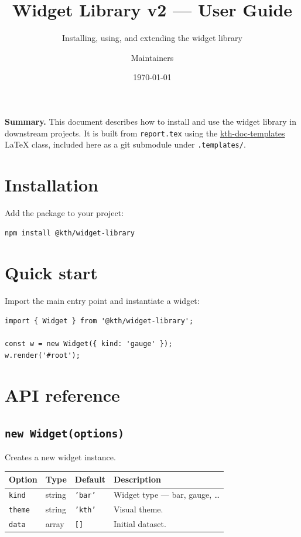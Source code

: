 \documentclass[english,11pt]{kth-document}
\title{Widget Library v2 --- User Guide}
\subtitle{Installing, using, and extending the widget library}
\author{Maintainers}
\affiliation{KTH Royal Institute of Technology}
\date{\today}
\begin{document}
\maketitle

\begin{kthbox}
\textbf{Summary.} This document describes how to install and use the
widget library in downstream projects. It is built from \texttt{report.tex}
using the \href{https://github.com/kth/kth-doc-templates}{kth-doc-templates}
LaTeX class, included here as a git submodule under \texttt{.templates/}.
\end{kthbox}

\section{Installation}

Add the package to your project:

\begin{verbatim}
npm install @kth/widget-library
\end{verbatim}

\section{Quick start}

Import the main entry point and instantiate a widget:

\begin{verbatim}
import { Widget } from '@kth/widget-library';

const w = new Widget({ kind: 'gauge' });
w.render('#root');
\end{verbatim}

\section{API reference}

\subsection{\texttt{new Widget(options)}}

Creates a new widget instance.

\begin{center}
\begin{tabular}{llll}
  \hline
  \textbf{Option} & \textbf{Type} & \textbf{Default} & \textbf{Description} \\
  \hline
  \texttt{kind}  & string & \texttt{'bar'} & Widget type --- bar, gauge, \ldots \\
  \texttt{theme} & string & \texttt{'kth'} & Visual theme. \\
  \texttt{data}  & array  & \texttt{[]}    & Initial dataset. \\
  \hline
\end{tabular}
\end{center}
\end{document}
